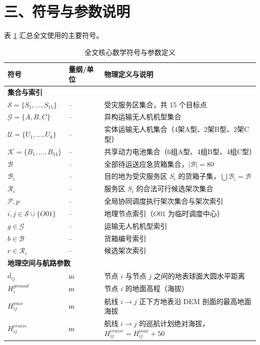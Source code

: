 \documentclass[withoutpreface,bwprint]{format}
\begin{document}
\section{三、符号与参数说明}

表 \ref{tab:notations} 汇总全文使用的主要符号。

\begin{table}[H]
\centering
\small
\caption{全文核心数学符号与参数定义}
\label{tab:notations}
\begin{tabularx}{\textwidth}{p{3.2cm} p{2.2cm} X}
\toprule
\textbf{符号} & \textbf{量纲/单位} & \textbf{物理定义与说明} \\
\midrule
\multicolumn{3}{l}{\textbf{集合与索引}} \\
$\mathcal{S} = \{S_1, \dots, S_{15}\}$ & -- & 受灾服务区集合，共 15 个目标点 \\
$\mathcal{G} = \{A, B, C\}$ & -- & 异构运输无人机机型集合 \\
$\mathcal{U} = \{U_1, \dots, U_8\}$ & -- & 实体运输无人机集合（4架A型、2架B型、2架C型） \\
$\mathcal{K} = \{B_1, \dots, B_{14}\}$ & -- & 共享动力电池集合（6组A型、4组B型、4组C型） \\
$\mathcal{B}$ & -- & 全部待运送应急货箱集合，$|\mathcal{B}| = 80$ \\
$\mathcal{B}_i$ & -- & 目的地为受灾服务区 $S_i$ 的货箱子集，$\bigcup \mathcal{B}_i = \mathcal{B}$ \\
$\mathcal{R}_i$ & -- & 服务区 $S_i$ 的合法可行候选架次集合 \\
$\mathcal{P}, p$ & -- & 全局协同调度执行架次集合与架次索引 \\
$i, j \in \mathcal{S} \cup \{O01\}$ & -- & 地理节点索引（$O01$ 为临时调度中心） \\
$g \in \mathcal{G}$ & -- & 运输无人机机型索引 \\
$b \in \mathcal{B}$ & -- & 货箱编号索引 \\
$r \in \mathcal{R}_i$ & -- & 候选架次索引 \\
\midrule
\multicolumn{3}{l}{\textbf{地理空间与航路参数}} \\
$d_{ij}$ & $\text{m}$ & 节点 $i$ 与节点 $j$ 之间的地表球面大圆水平距离 \\
$H_i^{ground}$ & $\text{m}$ & 节点 $i$ 的地面高程（海拔） \\
$H_{ij}^{max}$ & $\text{m}$ & 航线 $i \to j$ 正下方地表沿 DEM 剖面的最高地面海拔 \\
$H_{ij}^{cruise}$ & $\text{m}$ & 航线 $i \to j$ 的巡航计划绝对海拔，$H_{ij}^{cruise} = H_{ij}^{max} + 50$ \\

\end{tabularx}
\end{table}
\end{document}
